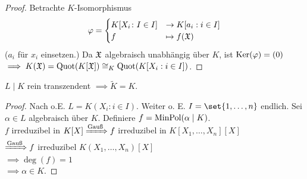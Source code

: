 \begin{proof}
	Betrachte $K$-Isomorphismus
	\begin{align*}
		\varphi = \begin{cases}
			K[X_i \colon I \in I] &\to K[a_i : i \in I]\\
			f & \mapsto f(\mathfrak{X})
		\end{cases} 
	\end{align*}
	($a_i$ für $x_i$ einsetzen.) Da $\mathfrak{X}$ algebraisch unabhängig über $K$, ist $\operatorname{Ker}(\varphi) = (0)$\\
	$\implies K(\mathfrak{X}) = \operatorname{Quot}(K[\mathfrak{X}]) \cong_K \operatorname{Quot}(K[X_i : i \in I])$.
\end{proof}
\begin{proposition}
	$L\mid K$ rein transzendent $\implies \tilde{K} = K$.
\end{proposition}
\begin{proof}
	Nach  o.E. $L = K(X_i : i \in I)$. Weiter o. E. $I = \set{1, \dots,n}$ endlich. Sei $\alpha \in L$ algebraisch über $K$. Definiere $f = \operatorname{MinPol}(\alpha \mid K)$.\\
	$f$ irreduzibel in $K[X] \xRightarrow{\text{Gauß}} f$ irreduzibel in $K[X_1, \dots, X_n][X]$\\
	$\xRightarrow{\text{Gauß}} f$ irreduzibel $K(X_1, \dots, X_n)[X]$\\
	$\implies \deg(f) = 1$\\
	$\implies \alpha \in K$.
\end{proof}